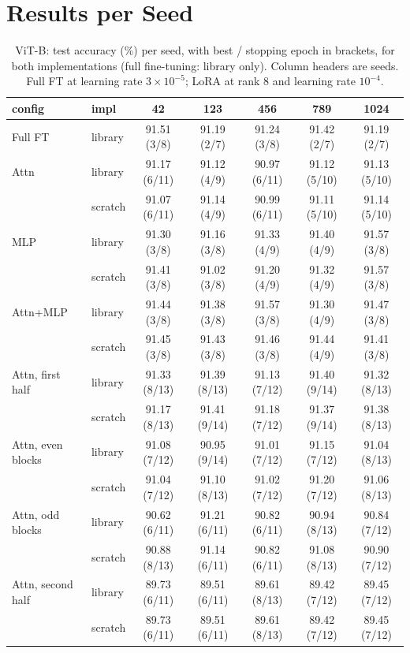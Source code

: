\chapter{Results per Seed}
\label{app:seeds}

\begin{table}[H]
\centering\footnotesize
\setlength{\tabcolsep}{2.5pt}
\begin{tabular}{llccccc}
\toprule
config & impl & 42 & 123 & 456 & 789 & 1024 \\
\midrule
Full FT & library & 91.51 (3/8) & 91.19 (2/7) & 91.24 (3/8) & 91.42 (2/7) & 91.19 (2/7) \\
Attn & library & 91.17 (6/11) & 91.12 (4/9) & 90.97 (6/11) & 91.12 (5/10) & 91.13 (5/10) \\
 & scratch & 91.07 (6/11) & 91.14 (4/9) & 90.99 (6/11) & 91.11 (5/10) & 91.14 (5/10) \\
MLP & library & 91.30 (3/8) & 91.16 (3/8) & 91.33 (4/9) & 91.40 (4/9) & 91.57 (3/8) \\
 & scratch & 91.41 (3/8) & 91.02 (3/8) & 91.20 (4/9) & 91.32 (4/9) & 91.57 (3/8) \\
Attn+MLP & library & 91.44 (3/8) & 91.38 (3/8) & 91.57 (3/8) & 91.30 (4/9) & 91.47 (3/8) \\
 & scratch & 91.45 (3/8) & 91.43 (3/8) & 91.46 (3/8) & 91.44 (4/9) & 91.41 (3/8) \\
Attn, first half & library & 91.33 (8/13) & 91.39 (8/13) & 91.13 (7/12) & 91.40 (9/14) & 91.32 (8/13) \\
 & scratch & 91.17 (8/13) & 91.41 (9/14) & 91.18 (7/12) & 91.37 (9/14) & 91.38 (8/13) \\
Attn, even blocks & library & 91.08 (7/12) & 90.95 (9/14) & 91.01 (7/12) & 91.15 (7/12) & 91.04 (8/13) \\
 & scratch & 91.04 (7/12) & 91.10 (8/13) & 91.02 (7/12) & 91.20 (7/12) & 91.06 (8/13) \\
Attn, odd blocks & library & 90.62 (6/11) & 91.21 (6/11) & 90.82 (6/11) & 90.94 (8/13) & 90.84 (7/12) \\
 & scratch & 90.88 (8/13) & 91.14 (6/11) & 90.82 (6/11) & 91.08 (8/13) & 90.90 (7/12) \\
Attn, second half & library & 89.73 (6/11) & 89.51 (6/11) & 89.61 (8/13) & 89.42 (7/12) & 89.45 (7/12) \\
 & scratch & 89.73 (6/11) & 89.51 (6/11) & 89.61 (8/13) & 89.42 (7/12) & 89.45 (7/12) \\
\bottomrule
\end{tabular}
\caption{ViT-B: test accuracy (\%) per seed, with best / stopping epoch in brackets, for both implementations (full
fine-tuning: library only). Column headers are seeds. Full FT at learning rate $3\times10^{-5}$; LoRA at rank 8
and learning rate $10^{-4}$.}
\label{tab:vitb_seed}
\end{table}

